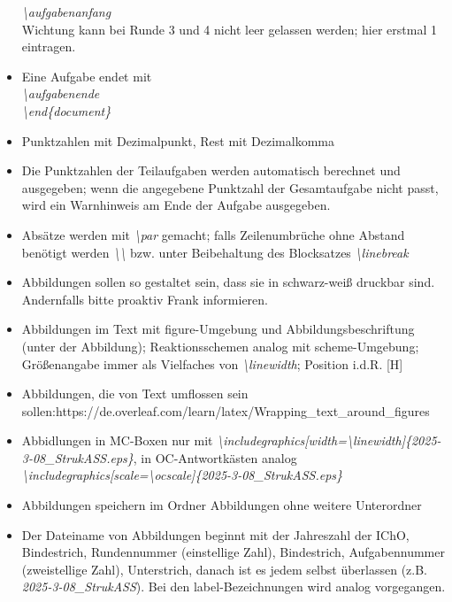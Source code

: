 \documentclass[./main.tex]{subfiles}
\begin{document}
\begin{itemize}
    \textit{\hypertarget{aufgabenanfang}{\textbackslash aufgabenanfang}}\\
    Wichtung kann bei Runde 3 und 4 nicht leer gelassen werden; hier erstmal 1 eintragen.
    \item Eine Aufgabe endet mit \\
    \textit{\hypertarget{aufgabenende}{\textbackslash aufgabenende}}\\\textit{\textbackslash end\{document\}}
    \item Punktzahlen mit Dezimalpunkt, Rest mit Dezimalkomma
    \item Die Punktzahlen der Teilaufgaben werden automatisch berechnet und ausgegeben; wenn die angegebene Punktzahl der Gesamtaufgabe nicht passt, wird ein Warnhinweis am Ende der Aufgabe ausgegeben. 
    \item Abs\"atze werden mit \hypertarget{par}{\textit{\textbackslash par}} gemacht; falls Zeilenumbr\"uche ohne Abstand ben\"otigt werden \hypertarget{textbackslash}{\textit{\textbackslash\textbackslash}} bzw. unter Beibehaltung des Blocksatzes \textit{\hypertarget{linebreak}{\textbackslash linebreak}}
    \item Abbildungen sollen so gestaltet sein, dass sie in schwarz-wei\ss{} druckbar sind. Andernfalls bitte proaktiv Frank informieren. 
    \item Abbildungen im Text mit figure-Umgebung und Abbildungsbeschriftung (unter der Abbildung); Reaktionsschemen analog mit scheme-Umgebung; Gr\"o\ss{}enangabe immer als Vielfaches von \textit{\hypertarget{linewidth}{\textbackslash linewidth}}; Position i.d.R. [H]
    \item Abbildungen, die von Text umflossen sein sollen:\newline https://de.overleaf.com/learn/latex/Wrapping\_text\_around\_figures
    \item Abbidlungen in MC-Boxen nur mit \textit{\hypertarget{includegraphics}{\textbackslash includegraphics[width=\textbackslash linewidth]\{2025-3-08\_StrukASS.eps\}}}, in OC-Antwortk\"asten analog \hypertarget{ocscale}{\textit{\textbackslash includegraphics[scale=\textbackslash ocscale]\{2025-3-08\_StrukASS.eps\}}}
    \item Abbildungen speichern im Ordner Abbildungen ohne weitere Unterordner
    \item Der Dateiname von Abbildungen beginnt mit der Jahreszahl der IChO, Bindestrich, Rundennummer (einstellige Zahl), Bindestrich, Aufgabennummer (zweistellige Zahl), Unterstrich, danach ist es jedem selbst \"uberlassen (z.B. \textit{2025-3-08\_StrukASS}). Bei den label-Bezeichnungen wird analog vorgegangen. 

\end{itemize}
\end{document}
